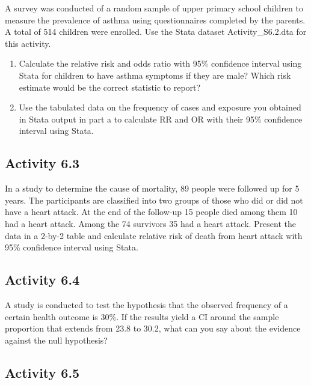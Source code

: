 \documentclass[
]{memoir}
\providecommand{\tightlist}{%
  \setlength{\itemsep}{0pt}\setlength{\parskip}{0pt}}
\begin{document}
A survey was conducted of a random sample of upper primary school children to measure the prevalence of asthma using questionnaires completed by the parents. A total of 514 children were enrolled. Use the Stata dataset Activity\_S6.2.dta for this activity.

\begin{enumerate}
\def\labelenumi{\alph{enumi})}
\tightlist
\item
  Calculate the relative risk and odds ratio with 95\% confidence interval using Stata for children to have asthma symptoms if they are male? Which risk estimate would be the correct statistic to report?
\item
  Use the tabulated data on the frequency of cases and exposure you obtained in Stata output in part a to calculate RR and OR with their 95\% confidence interval using Stata.
\end{enumerate}

\hypertarget{activity-6.3}{%
\subsection*{Activity 6.3}\label{activity-6.3}}

In a study to determine the cause of mortality, 89 people were followed up for 5 years. The participants are classified into two groups of those who did or did not have a heart attack. At the end of the follow-up 15 people died among them 10 had a heart attack. Among the 74 survivors 35 had a heart attack. Present the data in a 2-by-2 table and calculate relative risk of death from heart attack with 95\% confidence interval using Stata.

\hypertarget{activity-6.4}{%
\subsection*{Activity 6.4}\label{activity-6.4}}

A study is conducted to test the hypothesis that the observed frequency of a certain health outcome is 30\%. If the results yield a CI around the sample proportion that extends from 23.8 to 30.2, what can you say about the evidence against the null hypothesis?

\hypertarget{activity-6.5}{%
\subsection*{Activity 6.5}\label{activity-6.5}}
\end{document}

